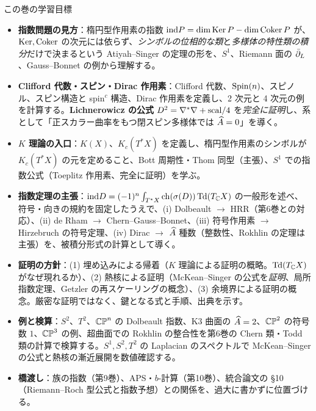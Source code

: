 \begin{goalbox}{この巻の学習目標}
\begin{itemize}
\item \textbf{指数問題の見方}：楕円型作用素の指数 $\mathrm{ind} P=\dim\operatorname{Ker} P-\dim\operatorname{Coker} P$ が、$\operatorname{Ker},\operatorname{Coker}$ の次元には依らず、\emph{シンボルの位相的な類}と\emph{多様体の特性類の積分}だけで決まるという Atiyah--Singer の定理の形を、$S^1$、Riemann 面の $\bar\partial_L$、Gauss--Bonnet の例から理解する。
\item \textbf{Clifford 代数・スピン・Dirac 作用素}：Clifford 代数、$\mathrm{Spin}(n)$、スピノル、スピン構造と spin$^c$ 構造、Dirac 作用素を定義し、2 次元と 4 次元の例を計算する。\textbf{Lichnerowicz の公式} $D^2=\nabla^*\nabla+\mathrm{scal}/4$ を\emph{完全に証明}し、系として「正スカラー曲率をもつ閉スピン多様体では $\widehat{A}=0$」を導く。
\item \textbf{$K$ 理論の入口}：$K(X)$、$K_c(T^*X)$ を定義し、楕円型作用素のシンボルが $K_c(T^*X)$ の元を定めること、Bott 周期性・Thom 同型（主張）、$S^1$ での指数公式（Toeplitz 作用素、完全に証明）を学ぶ。
\item \textbf{指数定理の主張}：$\mathrm{ind} D=(-1)^n\int_{T^*X}\mathrm{ch}(\sigma(D))\,\mathrm{Td}(T_{\mathbb C}X)$ の一般形を述べ、符号・向きの規約を固定したうえで、(i) Dolbeault $\to$ HRR（第6巻との対応）、(ii) de Rham $\to$ Chern--Gauss--Bonnet、(iii) 符号作用素 $\to$ Hirzebruch の符号定理、(iv) Dirac $\to$ $\widehat{A}$ 種数（整数性、Rokhlin の定理は主張）を、被積分形式の計算として導く。
\item \textbf{証明の方針}：(1) 埋め込みによる帰着（$K$ 理論による証明の概略。$\mathrm{Td}(T_{\mathbb C}X)$ がなぜ現れるか）、(2) 熱核による証明（McKean--Singer の公式を\emph{証明}、局所指数定理、Getzler の再スケーリングの概念）、(3) 余境界による証明の概念。厳密な証明ではなく、鍵となる式と手順、出典を示す。
\item \textbf{例と検算}：$S^2$、$T^2$、$\mathbb{CP}^n$ の Dolbeault 指数、K3 曲面の $\widehat{A}=2$、$\mathbb{CP}^2$ の符号数 $1$、$\mathbb{CP}^3$ の例、超曲面での Rokhlin の整合性を第6巻の Chern 類・Todd 類の計算で検算する。$S^1,S^2,T^2$ の Laplacian のスペクトルで McKean--Singer の公式と熱核の漸近展開を数値確認する。
\item \textbf{橋渡し}：族の指数（第9巻）、APS・$b$-計算（第10巻）、統合論文の \S10（Riemann--Roch 型公式と指数予想）との関係を、過大に書かずに位置づける。
\end{itemize}
\end{goalbox}

